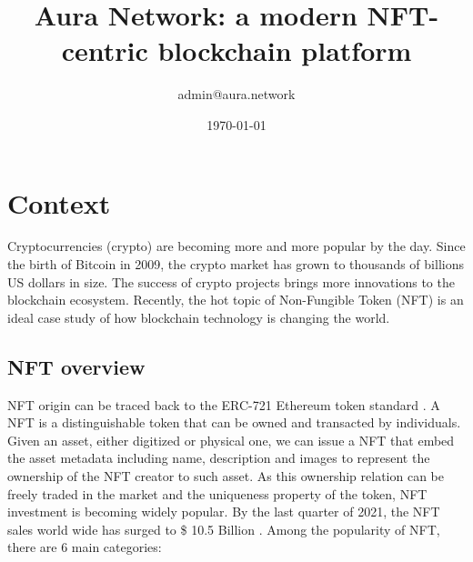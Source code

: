 \documentclass[12pt]{article}
\title{Aura Network: a modern NFT-centric blockchain platform}
\author{admin@aura.network}
\date{\today}
\begin{document}
\maketitle


\section{Context}

Cryptocurrencies (crypto) are becoming more and more popular by the day. Since the birth of Bitcoin in 2009, the crypto market has grown to thousands of billions US dollars in size. The success of crypto projects brings more innovations to the blockchain ecosystem. Recently, the hot topic of Non-Fungible Token (NFT) is an ideal case study of how blockchain technology is changing the world.

\subsection{NFT overview}
NFT origin can be traced back to the ERC-721 Ethereum token standard \cite{entriken2018erc}. A NFT is a distinguishable token that can be owned and transacted by individuals. 
Given an asset, either digitized or physical one, we can issue a NFT that embed the asset metadata including name, description and images to represent the ownership of the NFT creator to such asset. As this ownership relation can be freely traded in the market and the uniqueness property of the token, NFT investment is becoming widely popular. By the last quarter of 2021, the NFT sales world wide has surged to \$ 10.5 Billion \cite{nftsale}. Among the popularity of NFT, there are 6 main categories:
\end{document}
